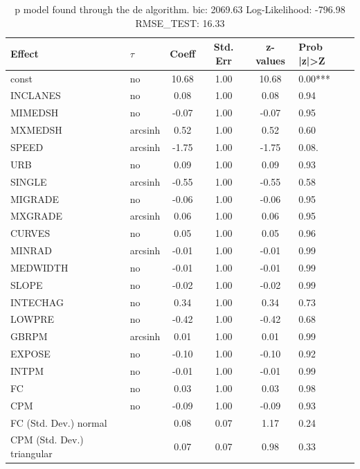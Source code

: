 \begin{table}
	\caption{p model found through the de algorithm. bic: 2069.63 Log-Likelihood: -796.98 RMSE_TEST: 16.33}
	\begin{center}
		\begin{tabular}{|l|l|c|c|c|l|}
			\hline
			Effect & $\tau$ & Coeff & Std. Err & z-values & Prob |z|>Z \\
			\hline
			const & no & 10.68 & 1.00 & 10.68 & 0.00*** \\
			\hline
			INCLANES & no & 0.08 & 1.00 & 0.08 & 0.94 \\
			\hline
			MIMEDSH & no & -0.07 & 1.00 & -0.07 & 0.95 \\
			\hline
			MXMEDSH & arcsinh & 0.52 & 1.00 & 0.52 & 0.60 \\
			\hline
			SPEED & arcsinh & -1.75 & 1.00 & -1.75 & 0.08. \\
			\hline
			URB & no & 0.09 & 1.00 & 0.09 & 0.93 \\
			\hline
			SINGLE & arcsinh & -0.55 & 1.00 & -0.55 & 0.58 \\
			\hline
			MIGRADE & no & -0.06 & 1.00 & -0.06 & 0.95 \\
			\hline
			MXGRADE & arcsinh & 0.06 & 1.00 & 0.06 & 0.95 \\
			\hline
			CURVES & no & 0.05 & 1.00 & 0.05 & 0.96 \\
			\hline
			MINRAD & arcsinh & -0.01 & 1.00 & -0.01 & 0.99 \\
			\hline
			MEDWIDTH & no & -0.01 & 1.00 & -0.01 & 0.99 \\
			\hline
			SLOPE & no & -0.02 & 1.00 & -0.02 & 0.99 \\
			\hline
			INTECHAG & no & 0.34 & 1.00 & 0.34 & 0.73 \\
			\hline
			LOWPRE & no & -0.42 & 1.00 & -0.42 & 0.68 \\
			\hline
			GBRPM & arcsinh & 0.01 & 1.00 & 0.01 & 0.99 \\
			\hline
			EXPOSE & no & -0.10 & 1.00 & -0.10 & 0.92 \\
			\hline
			INTPM & no & -0.01 & 1.00 & -0.01 & 0.99 \\
			\hline
			FC & no & 0.03 & 1.00 & 0.03 & 0.98 \\
			\hline
			CPM & no & -0.09 & 1.00 & -0.09 & 0.93 \\
			\hline
			FC (Std. Dev.) normal &  & 0.08 & 0.07 & 1.17 & 0.24 \\
			\hline
			CPM (Std. Dev.) triangular &  & 0.07 & 0.07 & 0.98 & 0.33 \\
			\hline
		\end{tabular}
	\end{center}
\end{table}